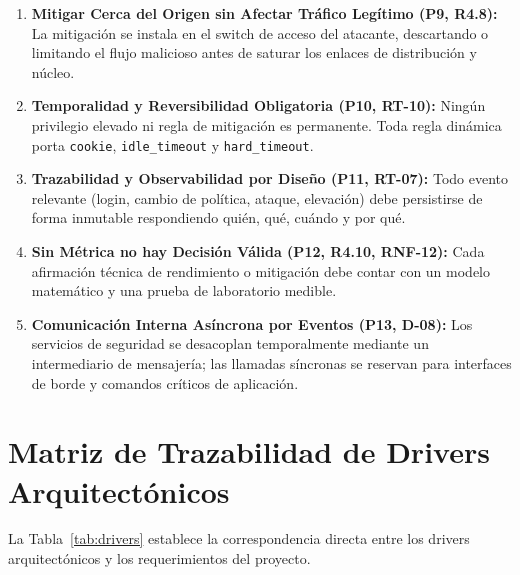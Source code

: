 \documentclass[11pt,a4paper]{report}
\begin{document}
\begin{enumerate}[label=\textbf{P\arabic*.}, leftmargin=*]
    \item \textbf{Mitigar Cerca del Origen sin Afectar Tráfico Legítimo (P9, R4.8):} La mitigación se instala en el switch de acceso del atacante, descartando o limitando el flujo malicioso antes de saturar los enlaces de distribución y núcleo.
    \item \textbf{Temporalidad y Reversibilidad Obligatoria (P10, RT-10):} Ningún privilegio elevado ni regla de mitigación es permanente. Toda regla dinámica porta \texttt{cookie}, \texttt{idle\_timeout} y \texttt{hard\_timeout}.
    \item \textbf{Trazabilidad y Observabilidad por Diseño (P11, RT-07):} Todo evento relevante (login, cambio de política, ataque, elevación) debe persistirse de forma inmutable respondiendo quién, qué, cuándo y por qué.
    \item \textbf{Sin Métrica no hay Decisión Válida (P12, R4.10, RNF-12):} Cada afirmación técnica de rendimiento o mitigación debe contar con un modelo matemático y una prueba de laboratorio medible.
    \item \textbf{Comunicación Interna Asíncrona por Eventos (P13, D-08):} Los servicios de seguridad se desacoplan temporalmente mediante un intermediario de mensajería; las llamadas síncronas se reservan para interfaces de borde y comandos críticos de aplicación.
\end{enumerate}

\section{Matriz de Trazabilidad de Drivers Arquitectónicos}
La Tabla~\ref{tab:drivers} establece la correspondencia directa entre los drivers arquitectónicos y los requerimientos del proyecto.
\end{document}
